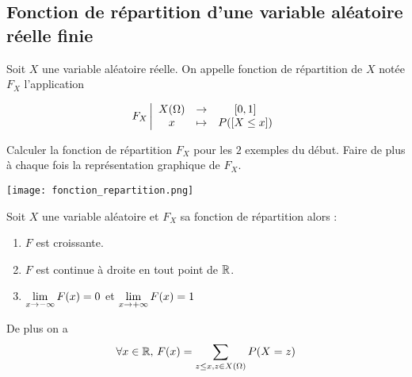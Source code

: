 \documentclass[a4paper, 11pt]{article}
\begin{document}
\subsection{Fonction de r\'epartition d'une variable al\'eatoire r\'eelle finie}


 

\begin{defi} Soit $X$ une variable al\'eatoire r\'eelle.
 On appelle fonction de r\'epartition de $X$ not\'ee $F_X$ l'application
 
$$F_X \left|\begin{array}{ccc}
 X(\Omega) & \rightarrow &[0,1] \\
x &\mapsto &P([X\leq x])
\end{array}\right.$$
 
\end{defi}
 


\begin{exemple} 
Calculer la fonction de r\'epartition $F_X$ pour les $2$ exemples du d\'ebut. Faire de plus \`{a} chaque fois la repr\'esentation graphique de $F_X$.
\end{exemple} 
\begin{center}
\texttt{[image: fonction\_repartition.png]}

\end{center}






 
\begin{prop}
Soit $X$ une variable aléatoire et $F_X$ sa fonction de répartition alors :
\begin{enumerate}
\item $F$ est croissante. 
\item $F$ est continue à droite en tout point de $\mathbb{R}$. 
\item $\displaystyle \lim_{x\rightarrow -\infty} F(x) = 0$  et $\displaystyle \lim_{x\rightarrow +\infty} F(x) = 1$
\end{enumerate}
De plus on a 
$$\forall x\in \mathbb{R}, \, F(x) =\sum_{z \leq x, z\in X(\Omega)} P(X=z)$$
\end{prop}
\end{document}
